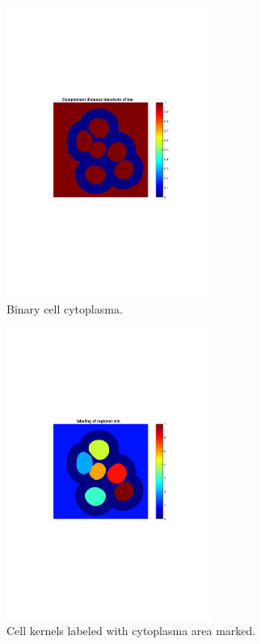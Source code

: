 \documentclass[10pt,twocolumn]{article}
\begin{document}
\begin{figure}[ht]
\centering
\includegraphics[width=0.6\textwidth]{Bilder/CellBwMask.pdf}
\caption{Binary cell cytoplasma.}
\label{fig:CellBWMask}
\end{figure}

\begin{figure}[ht]
\centering
\includegraphics[width=0.6\textwidth]{Bilder/CellBwLabeldKernels.pdf}
\caption{Cell kernels labeled with cytoplasma area marked.}
\label{fig:CellCyto}
\end{figure}
\end{document}
